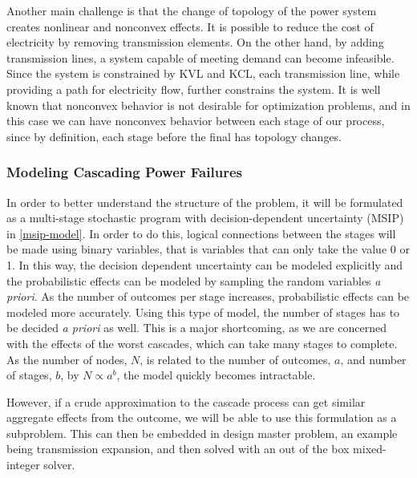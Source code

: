 Another main challenge is that the change of topology of the power system creates nonlinear and nonconvex effects.  It is possible to reduce the cost of electricity by removing transmission elements.  On the other hand, by adding transmission lines, a system capable of meeting demand can become infeasible.  Since the system is constrained by KVL and KCL, each transmission line, while providing a path for electricity flow, further constrains the system.  It is well known that nonconvex behavior is not desirable for optimization problems, and in this case we can have nonconvex behavior between each stage of our process, since by definition, each stage before the final has topology changes.

\subsubsection{Modeling Cascading Power Failures}
In order to better understand the structure of the problem, it will be formulated as a multi-stage stochastic program with decision-dependent uncertainty (MSIP) in \cref{msip-model}.  In order to do this, logical connections between the stages will be made using binary variables, that is variables that can only take the value 0 or 1.  In this way, the decision dependent uncertainty can be modeled explicitly and the probabilistic effects can be modeled by sampling the random variables {\it a priori}.  As the number of outcomes per stage increases, probabilistic effects can be modeled more accurately.  Using this type of model, the number of stages has to be decided {\it a priori} as well.  This is a major shortcoming, as we are concerned with the effects of the worst cascades, which can take many stages to complete.  As the number of nodes, $N$, is related to the number of outcomes, $a$, and number of stages, $b$, by $N \propto a^{b}$, the model quickly becomes intractable. 

 However, if a crude approximation to the cascade process can get similar aggregate effects from the outcome, we will be able to use this formulation as a subproblem.  This can then be embedded in design master problem, an example being transmission expansion, and then solved with an out of the box mixed-integer solver.


